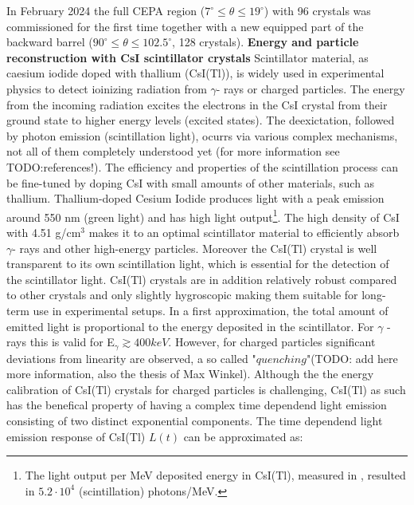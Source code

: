 In February 2024 the full CEPA region ($7^{\circ} \leq \theta \leq 19^{\circ}$) with 96 crystals was commissioned for the first time together with a new equipped part of the backward barrel ($90^{\circ} \leq \theta \leq 102.5^{\circ}$, 128 crystals).\newline   
\textbf{Energy and particle reconstruction with CsI scintillator crystals}\newline
Scintillator material, as caesium iodide doped with thallium (CsI(Tl)), is widely used in experimental physics to detect ioinizing radiation from $\gamma$- rays or charged particles. The energy from the incoming radiation excites the electrons in the CsI crystal from their ground state to higher energy levels (excited states). The deexictation, followed by photon emission (scintillation light), ocurrs via various complex mechanisms, not all of them completely understood yet (for more information see TODO:references!). The efficiency and properties of the scintillation process can be fine-tuned by doping CsI with small amounts of other materials, such as thallium. Thallium-doped Cesium Iodide produces light with a peak emission around 550 nm (green light) and has high light output\footnote{The light output per MeV deposited energy in CsI(Tl), measured in \cite{holl1988measurement}, resulted in  $5.2\cdot10^{4}$ (scintillation) photons/MeV.}. The high density of CsI with 4.51 g/cm$^3$ makes it to an optimal scintillator material to efficiently absorb $\gamma$- rays and other high-energy particles. Moreover the CsI(Tl) crystal is well transparent to its own scintillation light, which is essential for the detection of the scintillator light. CsI(Tl) crystals are in addition relatively robust compared to other crystals and only slightly hygroscopic making them suitable for long-term use in experimental setups.\newline
In a first approximation, the total amount of emitted light is proportional to the energy deposited in the scintillator. For $\gamma$ -rays this is valid for E$_{\gamma} \gtrsim 400 keV$\cite{syntfeld2007non}. However, for charged particles significant deviations from linearity are observed, a so called "$quenching$"(TODO: add here more information, also the thesis of Max Winkel).\newline
Although the the energy calibration of CsI(Tl) crystals for charged particles is challenging, CsI(Tl) as such  has the benefical property of having a complex time dependend light emission consisting of two distinct exponential components. The time dependend light emission response of CsI(Tl) $L(t)$ can be approximated as:
